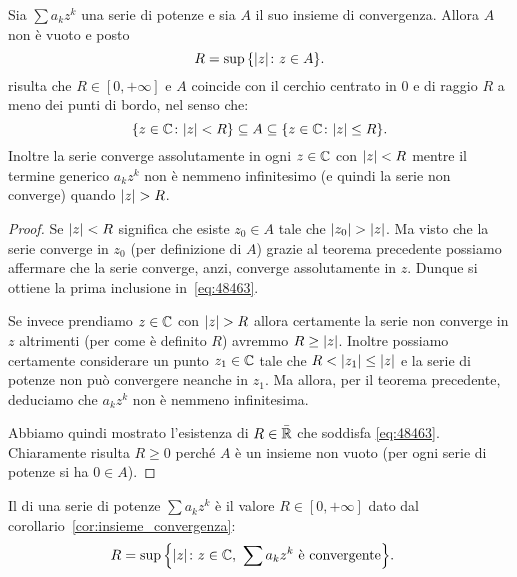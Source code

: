 \begin{corollary}%
\mymark{**}
\label{cor:insieme_convergenza}%
Sia $\sum a_k z^k$ una serie di potenze e sia $A$ il suo insieme di convergenza.
Allora $A$ non è vuoto e posto
\[
  R= \sup {\left\{ {\left|z\right|}\colon z\in A \right\}}.
\]
risulta che $R\in[0,+\infty]$ e $A$ coincide con il cerchio centrato in $0$
e di raggio $R$ a meno dei punti di bordo, nel senso che:
\begin{equation}\label{eq:48463}
   {\left\{ z\in \mathbb C\colon {\left|z\right|} < R \right\}}
   \subseteq A
   \subseteq {\left\{ z\in \mathbb C\colon {\left|z\right|}\le R \right\}}.
\end{equation}
Inoltre la serie converge assolutamente in ogni $z\in \mathbb C$ con ${\left|z\right|}<R$
mentre
il termine generico $a_k z^k$ non è nemmeno infinitesimo (e quindi la serie non converge)
quando ${\left|z\right|}>R$.
\end{corollary}
%
\begin{proof}
Se ${\left|z\right|}<R$ significa che esiste $z_0\in A$ tale che ${\left|z_0\right|} > {\left|z\right|}$.
Ma visto che la serie converge in $z_0$ (per definizione di $A$) grazie al teorema
precedente possiamo affermare che la serie converge, anzi, converge assolutamente
in $z$. Dunque si ottiene la prima inclusione in~\eqref{eq:48463}.

Se invece prendiamo $z\in \mathbb C$ con ${\left|z\right|}>R$ allora
certamente la serie non converge in $z$ altrimenti (per come è definito $R$)
avremmo $R\ge {\left|z\right|}$.
Inoltre possiamo certamente considerare un punto $z_1\in\mathbb C$
tale che $R < {\left|z_1\right|} \le {\left|z\right|}$ e la serie
di potenze non può convergere neanche in $z_1$.
Ma allora, per il teorema precedente,
deduciamo che $a_k z^k$ non è nemmeno infinitesima.

Abbiamo quindi mostrato l'esistenza di $R\in \bar {\mathbb R}$ che soddisfa \eqref{eq:48463}.
Chiaramente risulta $R\ge 0$ perché $A$ è un insieme non vuoto
(per ogni serie di potenze si ha $0\in A$).
\end{proof}

\begin{definition}
\mymark{**}
Il  di una serie di potenze $\sum a_k z^k$
è il valore $R\in[0,+\infty]$
dato dal corollario~\ref{cor:insieme_convergenza}:
\begin{align*}
  R &= \sup {\left\{ {\left|z\right|}\colon z\in \mathbb C,\ \sum a_k z^k \text{ è convergente} \right\}}.
\end{align*}
\end{definition}

